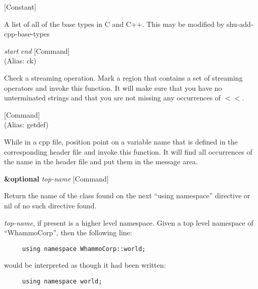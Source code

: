 \vspace{1em}
\noindent
{}
\usebox{\funcname}
 \hfill [Constant]

\begin{doc-string}
A list of all of the base types in C and C++.  This may be modified by shu-add-cpp-base-types
\end{doc-string}

\vspace{1em}
\noindent
{}
\usebox{\funcname}\emph{start} \emph{end}
 \hfill [Command]\\%
 (Alias: ck)

\begin{doc-string}
Check a streaming operation.   Mark a region that contains a set of streaming
operators and invoke this function.  It will make sure that you have no unterminated
strings and that you are not missing any occurrences of $<$$<$.
\end{doc-string}

\vspace{1em}
\noindent
{}
\usebox{\funcname}
 \hfill [Command]\\%
 (Alias: getdef)

\begin{doc-string}
While in a cpp file, position point on a variable name that is defined in the
corresponding header file and invoke this function.  It will find all occurrences of
the name in the header file and put them in the message area.
\end{doc-string}

\vspace{1em}
\noindent
{}
\usebox{\funcname}\textbf{\&optional} \emph{top-name}
 \hfill [Command]

\begin{doc-string}
Return the name of the class found on the next ``using namespace'' directive
or nil of no such directive found.

\emph{top-name}, if present is a higher level namespace.  Given a top level namespace
of ``WhammoCorp'', then the following line:

\small{\begin{verbatim}
     using namespace WhammoCorp::world;
\end{verbatim}}

would be interpreted as though it had been written:

\small{\begin{verbatim}
     using namespace world;
\end{verbatim}}
\end{doc-string}

